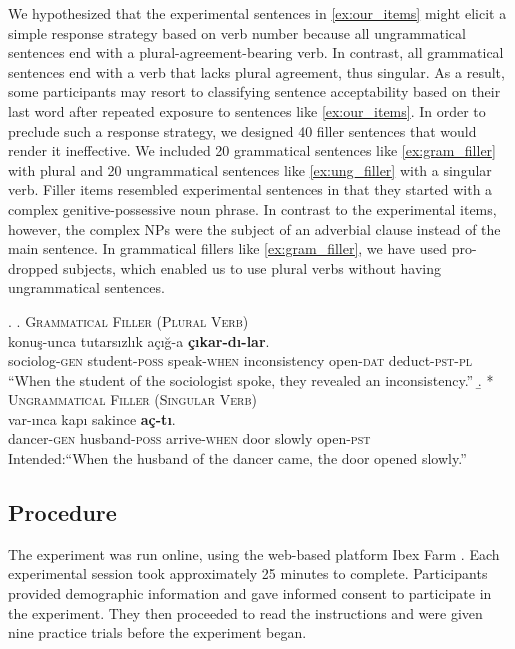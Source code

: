 \documentclass[]{interact}\usepackage[]{graphicx}\usepackage[]{color}
\theoremstyle{plain}%
\theoremstyle{definition}
\theoremstyle{remark}
\begin{document}
We hypothesized that the experimental sentences in \ref{ex:our_items} might elicit a simple response strategy based on verb number because all ungrammatical sentences end with a plural-agreement-bearing verb. In contrast, all grammatical sentences end with a verb that lacks plural agreement, thus singular. As a result, some participants may resort to classifying sentence acceptability based on their last word after repeated exposure to sentences like \ref{ex:our_items}. In order to preclude such a response strategy, we designed 40 filler sentences that would render it ineffective. We included 20 grammatical sentences like \ref{ex:gram_filler} with plural and 20 ungrammatical sentences like \ref{ex:ung_filler} with a singular verb. Filler items resembled experimental sentences in that they started with a complex genitive-possessive noun phrase. In contrast to the experimental items, however, the complex NPs were the subject of an adverbial clause instead of the main sentence. In grammatical fillers like \ref{ex:gram_filler}, we have used pro-dropped subjects, which enabled us to use plural verbs without having ungrammatical sentences. 


\ex. \label{ex:fillers}
  \a. \textsc{Grammatical Filler (Plural Verb)} \label{ex:gram_filler}\\
   konu\c{s}-unca tutars{\i}zl{\i}k a\c{c}{\i}\u{g}-a \textbf{\c{c}{\i}kar-d{\i}-lar}.\\ 
  sociolog-\textsc{gen}  student-\textsc{poss} speak-\textsc{when} inconsistency  open-\textsc{dat} deduct-\textsc{pst}-\textsc{pl}\\
  \glt ``When the student of the sociologist spoke, they revealed an inconsistency.''
  \b. * \textsc{Ungrammatical Filler (Singular Verb)} \label{ex:ung_filler}\\
   var-{\i}nca kap{\i} sakince \textbf{a\c{c}-t{\i}}. \\
  dancer-\textsc{gen}  husband-\textsc{poss} arrive-\textsc{when} door slowly  open-\textsc{pst}\\
  \glt Intended:``When the husband of the dancer came, the door opened slowly.''


\subsection{Procedure}

The experiment was run online, using the web-based platform Ibex Farm \citep{Drummond2013}. Each experimental session took approximately 25 minutes to complete. Participants provided demographic information and gave informed consent to participate in the experiment. They then proceeded to read the instructions and were given nine practice trials before the experiment began.
\end{document}

